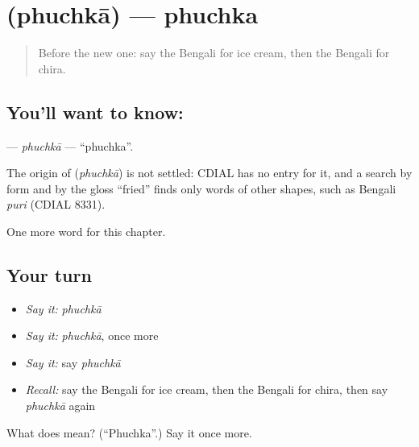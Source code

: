 \section[\texorpdfstring{\bn{ফুচকা} (phuchkā)}{ফুচকা (phuchkā)}]{ (phuchkā) — phuchka}

\label{lesson:BN-C257-phuchka}



\begin{quote}
Before the new one: say the Bengali for ice cream, then the Bengali for chira.
\end{quote}

\subsection*{You'll want to know: }
\textbf{} — \emph{phuchkā} — \textquotedblleft{}phuchka\textquotedblright{}.

\begin{cousinweb}
The origin of \textbf{} (\emph{phuchkā}) is not settled: CDIAL has no entry for it, and a search by form and by the gloss \textquotedblleft{}fried\textquotedblright{} finds only words of other shapes, such as Bengali \emph{puri} (CDIAL 8331).
\end{cousinweb}

\begin{grammarlens}[title={What you've built}]
One more word for this chapter.
\end{grammarlens}

\subsection*{Your turn}
\begin{itemize}
\raggedright
  \item \emph{Say it:} \emph{phuchkā}
  \item \emph{Say it:} \emph{phuchkā}, once more
  \item \emph{Say it:} say \emph{phuchkā}
  \item \emph{Recall:} say the Bengali for ice cream, then the Bengali for chira, then say \emph{phuchkā} again
\end{itemize}

\begin{tcolorbox}[breakable,colback=teal!4,colframe=teal!35!black,title={Before you move on}]
What does  mean? (\textquotedblleft{}Phuchka\textquotedblright{}.) Say it once more.
\end{tcolorbox}
